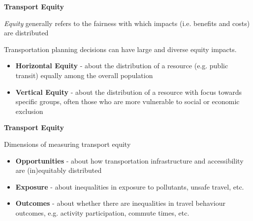 \documentclass[aspectratio=169]{beamer}
\begin{document}
\begin{frame}
	
	\textbf{Transport Equity}
	
	\vspace{4mm}
	
	
	\textit{Equity} generally refers to the fairness with which impacts (i.e. benefits and costs) are distributed 
	
	\vspace{2mm}
	
	Transportation planning decisions can have large and diverse equity
	impacts.
	
	\vspace{2mm}
	
	
	\begin{itemize}	
		\item \textbf{Horizontal Equity} - about the distribution of a resource (e.g. public transit) equally among the overall population
		
		\item \textbf{Vertical Equity} - about the distribution of a resource with focus towards specific groups, often those who are more vulnerable to social or economic exclusion
	\end{itemize}
	
	
\end{frame}




\begin{frame}
	
	\textbf{Transport Equity}
	
	\vspace{4mm}
	
	Dimensions of measuring transport equity
	
	\begin{itemize}	
		\item \textbf{Opportunities} - about how transportation infrastructure and accessibility are (in)equitably distributed
		
		\item \textbf{Exposure} - about inequalities in exposure to pollutants, unsafe travel, etc.
		
		\item \textbf{Outcomes} - about whether there are inequalities in travel behaviour outcomes, e.g. activity participation, commute times, etc.
		
	\end{itemize}
	
	
\end{frame}
\end{document}
